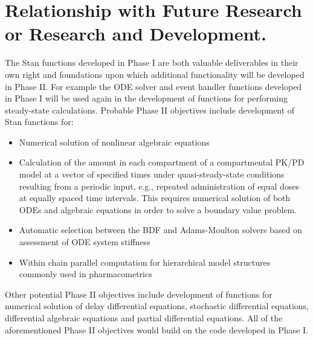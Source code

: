 \section{Relationship with Future Research or Research and
  Development.}





The Stan functions developed in Phase I are both valuable deliverables
in their own right and foundations upon which additional functionality
will be developed in Phase II. For example the ODE solver and event
handler functions developed in Phase I will be used again in the
development of functions for performing steady-state calculations.
Probable Phase II objectives include development of Stan functions
for:

\begin{itemize}
\item Numerical solution of nonlinear algebraic equations
\item Calculation of the amount in each compartment of a compartmental
  PK/PD model at a vector of specified times under quasi-steady-state
  conditions resulting from a periodic input, e.g., repeated
  administration of equal doses at equally spaced time intervals. This
  requires numerical solution of both ODEs and algebraic equations in
  order to solve a boundary value problem.
\item Automatic selection between the BDF and Adams-Moulton solvers
  based on assessment of ODE system stiffness
\item Within chain parallel computation for hierarchical model
  structures commonly used in pharmacometrics
\end{itemize}

Other potential Phase II objectives include development of functions
for numerical solution of delay differential equations, stochastic
differential equations, differential algebraic equations and partial
differential equations. All of the aforementioned Phase II objectives
would build on the code developed in Phase I.


